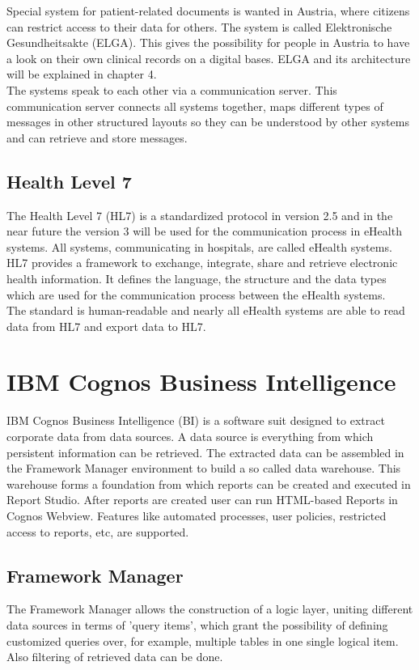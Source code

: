 \documentclass[a4paper]{article}
\begin{document}
	    Special system for patient-related documents is wanted in Austria, where
	    citizens can restrict access to their data for others. The system is
	    called Elektronische Gesundheitsakte (ELGA).
	    This gives the possibility for people in Austria to have a look on their
	    own clinical records on a digital bases. ELGA and its architecture will be
	    explained in chapter 4.\\
	    The systems speak to each other via a communication server.
	    This communication server connects all systems together, maps different
	    types of messages in other structured layouts so they can be understood by
	    other systems and can retrieve and store messages.
	\subsection{Health Level 7}
		The Health Level 7 (HL7) is a standardized protocol in version 2.5 and in
		the near future the version 3 will be used for the communication  process in
		eHealth systems.
		All systems, communicating in hospitals, are called eHealth
		systems.\\
		HL7 provides a framework to exchange, integrate, share and retrieve 
		electronic health information. It defines the language, the structure and the
		data types which are used for the communication process between the eHealth
		systems.\\
		The standard is human-readable and nearly all eHealth systems are able to
		read data from HL7 and export data to HL7.
		
	\newpage
	
	\section{IBM Cognos Business Intelligence}
	IBM Cognos Business Intelligence (BI) is a software suit designed to extract
	corporate data from data sources. A data source is everything from which
	persistent information can be retrieved. The extracted data can be assembled in
	the Framework Manager environment to build a so called data warehouse. This
	warehouse forms a foundation from which reports can be created and executed in
	Report Studio. After reports are created user can run HTML-based Reports in
	Cognos Webview. Features like automated processes, user policies, restricted
	access to reports, etc, are supported.
	
	\subsection{Framework Manager}
	The Framework Manager allows the construction of a logic layer, uniting different data sources in terms of 'query
	items', which grant the possibility of defining customized queries over, for
	example, multiple tables in one single logical item. Also filtering of retrieved data can be done.
\end{document}
